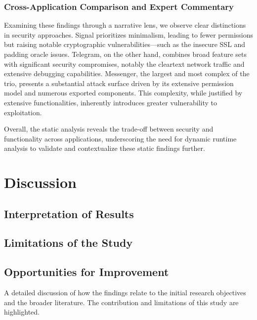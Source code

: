 \documentclass[a4paper,12pt]{report}
\begin{document}
\subsection{Cross-Application Comparison and Expert Commentary}
Examining these findings through a narrative lens, we observe clear distinctions in security approaches. Signal prioritizes minimalism, leading to fewer permissions but raising notable cryptographic vulnerabilities—such as the insecure SSL and padding oracle issues. Telegram, on the other hand, combines broad feature sets with significant security compromises, notably the cleartext network traffic and extensive debugging capabilities. Messenger, the largest and most complex of the trio, presents a substantial attack surface driven by its extensive permission model and numerous exported components. This complexity, while justified by extensive functionalities, inherently introduces greater vulnerability to exploitation.

Overall, the static analysis reveals the trade-off between security and functionality across applications, underscoring the need for dynamic runtime analysis to validate and contextualize these static findings further.

\chapter{Discussion}

\section{Interpretation of Results}

\section{Limitations of the Study}

\section{Opportunities for Improvement}


A detailed discussion of how the findings relate to the initial research objectives and the broader literature. The contribution and limitations of this study are highlighted.

\end{document}

